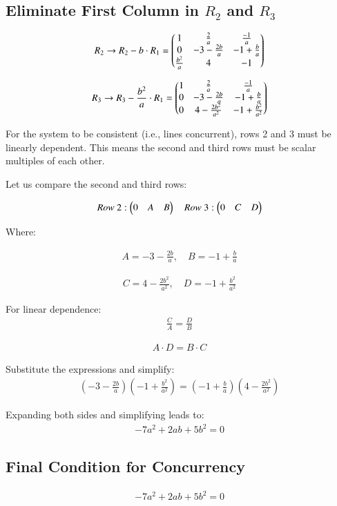 \documentclass{article}
\begin{document}
\subsection*{Eliminate First Column in $R_2$ and $R_3$}

\begin{align}
R_2 \rightarrow R_2 - b \cdot R_1 = 
\begin{pmatrix}
1 & \frac{2}{a} & \frac{-1}{a} \\
0 & -3 - \frac{2b}{a} & -1 + \frac{b}{a} \\
\frac{b^2}{a} & 4 & -1
\end{pmatrix}
\end{align}

\begin{align}
R_3 \rightarrow R_3 - \frac{b^2}{a} \cdot R_1 = 
\begin{pmatrix}
1 & \frac{2}{a} & \frac{-1}{a} \\
0 & -3 - \frac{2b}{a} & -1 + \frac{b}{a} \\
0 & 4 - \frac{2b^2}{a^2} & -1 + \frac{b^2}{a^2}
\end{pmatrix}
\end{align}

For the system to be consistent (i.e., lines concurrent), rows 2 and 3 must be linearly dependent. This means the second and third rows must be scalar multiples of each other.

Let us compare the second and third rows:

\begin{align}
Row\ 2: \begin{pmatrix}0 \quad A \quad B\end{pmatrix} \quad
Row\ 3: \begin{pmatrix}0 \quad C \quad D\end{pmatrix}
\end{align}

Where:

\begin{align}
A = -3 - \frac{2b}{a}, \quad B = -1 + \frac{b}{a}
\end{align}

\begin{align}
C = 4 - \frac{2b^2}{a^2}, \quad D = -1 + \frac{b^2}{a^2}
\end{align}

For linear dependence:
\begin{align}
\frac{C}{A} = \frac{D}{B}
\end{align}

\begin{align}
A \cdot D = B \cdot C
\end{align}

Substitute the expressions and simplify:
\begin{align}
(-3 - \frac{2b}{a})(-1 + \frac{b^2}{a^2}) = 
(-1 + \frac{b}{a})(4 - \frac{2b^2}{a^2})
\end{align}

Expanding both sides and simplifying leads to:
\begin{align}
-7a^2 + 2ab + 5b^2 = 0
\end{align}

\subsection*{Final Condition for Concurrency}

\begin{align}
\boxed{-7a^2 + 2ab + 5b^2 = 0}
\end{align}
\end{document}
